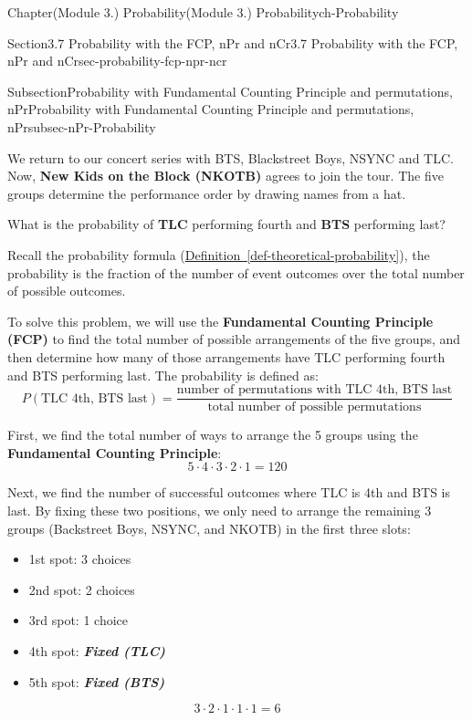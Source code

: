 \documentclass[oneside,10pt,]{book}
\newcommand{\xreffont}{\relax}
\newcommand{\ptxlistdisc}{\raisebox{0.3ex}{\textbullet}}
\newcommand{\alert}[1]{\textbf{\textit{#1}}}
\newcommand{\terminology}[1]{\textbf{#1}}
\begin{document}
\begin{chapterptx}{Chapter}{(Module 3.) Probability}{}{(Module 3.) Probability}{}{}{ch-Probability}
\begin{sectionptx}{Section}{3.7 Probability with the FCP, nPr and nCr}{}{3.7 Probability with the FCP, nPr and nCr}{}{}{sec-probability-fcp-npr-ncr}
\begin{subsectionptx}{Subsection}{Probability with Fundamental Counting Principle and permutations, nPr}{}{Probability with Fundamental Counting Principle and permutations, nPr}{}{}{subsec-nPr-Probability}
\begin{introduction}{}%
We return to our concert series with BTS, Blackstreet Boys, NSYNC and TLC. Now, \terminology{New Kids on the Block (NKOTB)} agrees to join the tour. The five groups determine the performance order by drawing names from a hat.%
\par
What is the probability of \terminology{TLC} performing fourth and \terminology{BTS} performing last?%
\end{introduction}%
Recall the probability formula (\hyperref[def-theoretical-probability]{Definition~{\xreffont\ref{def-theoretical-probability}}}), the probability is the fraction of the number of event outcomes over the total number of possible outcomes.%
\par
To solve this problem, we will use the \terminology{Fundamental Counting Principle (FCP)} to find the total number of possible arrangements of the five groups, and then determine how many of those arrangements have TLC performing fourth and BTS performing last.%
\noindent\hypertarget{subsec-nPr-Probability-5-main}{}\textbraceleft{}\textbraceright{}The probability is defined as:%
\begin{equation*}
P(\text{TLC 4th, BTS last}) = \frac{\text{number of permutations with TLC 4th, BTS last}}{\text{total number of possible permutations}}
\end{equation*}
%
\par
First, we find the total number of ways to arrange the 5 groups using the \terminology{Fundamental Counting Principle}:%
\begin{equation*}
5 \cdot 4 \cdot 3 \cdot 2 \cdot 1 = 120
\end{equation*}
%
\par
Next, we find the number of successful outcomes where TLC is 4th and BTS is last. By fixing these two positions, we only need to arrange the remaining 3 groups (Backstreet Boys, NSYNC, and NKOTB) in the first three slots:%
\begin{itemize}[label=\ptxlistdisc]
\item{}1st spot: 3 choices%
\item{}2nd spot: 2 choices%
\item{}3rd spot: 1 choice%
\item{}4th spot: \alert{Fixed (TLC)}%
\item{}5th spot: \alert{Fixed (BTS)}%
\end{itemize}
%
\begin{equation*}
3 \cdot 2 \cdot 1 \cdot 1 \cdot 1 = 6
\end{equation*}

\end{subsectionptx}
\end{sectionptx}
\end{chapterptx}
\end{document}
